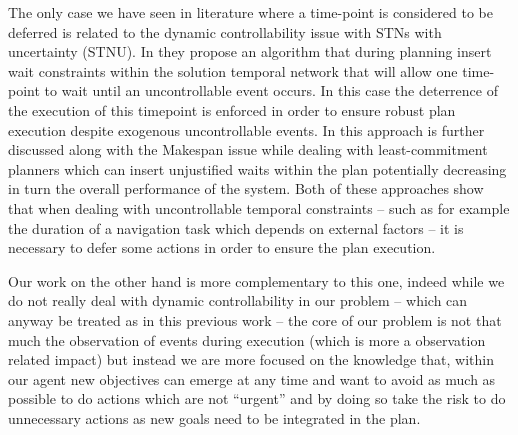 The only case we have seen in literature where a time-point is
considered to be deferred is related to the dynamic controllability
issue with STNs with uncertainty (STNU). In \cite{morris01} they propose 
an algorithm that during planning insert wait constraints within the
solution temporal network that will allow one time-point to wait until
an uncontrollable event occurs. In this case the deterrence of the
execution of this timepoint is enforced in order to ensure robust plan
execution despite exogenous uncontrollable events. In
\cite{gallien2006}  this approach is further discussed along with the
Makespan issue while dealing with least-commitment planners which can
insert unjustified waits within the plan potentially decreasing in turn the
overall performance of the system. Both of these approaches show that
when dealing with uncontrollable temporal constraints -- such as for
example the duration of a navigation task which depends on external
factors -- it is necessary to defer some actions in order to ensure
the plan execution. 

Our work on the other hand is more complementary to this one, indeed
while we do not really deal with dynamic controllability in our
problem -- which can anyway be treated as in this previous work -- the
core of our problem is not that much the observation of events during
execution (which is more a observation related impact) but instead we
are more focused on the knowledge that, within our agent new
objectives can emerge at any time and want to avoid as much as
possible to do actions which are not ``urgent'' and by doing so take
the risk to do unnecessary actions as new goals need to be integrated
in the plan.



